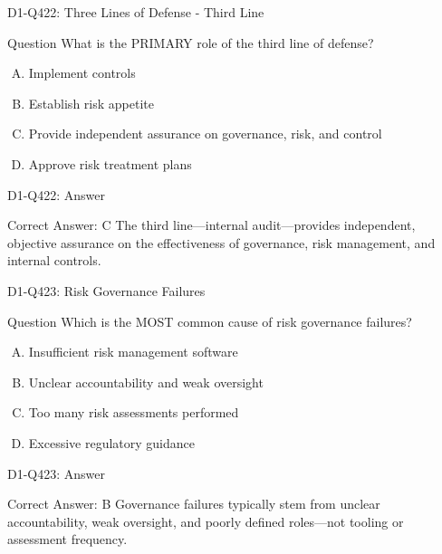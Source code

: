\documentclass{beamer}
\begin{document}
\begin{frame}{D1-Q422: Three Lines of Defense - Third Line}
	\begin{block}{Question}
		What is the PRIMARY role of the third line of defense?
	\end{block}
	\begin{enumerate}[(A)]
		\item Implement controls
		\item Establish risk appetite
		\item Provide independent assurance on governance, risk, and control
		\item Approve risk treatment plans
	\end{enumerate}
\end{frame}
\begin{frame}{D1-Q422: Answer}
	\begin{block}{Correct Answer: C}
		The third line—internal audit—provides independent, objective assurance on the effectiveness of governance, risk management, and internal controls.
	\end{block}
\end{frame}

\begin{frame}{D1-Q423: Risk Governance Failures}
	\begin{block}{Question}
		Which is the MOST common cause of risk governance failures?
	\end{block}
	\begin{enumerate}[(A)]
		\item Insufficient risk management software
		\item Unclear accountability and weak oversight
		\item Too many risk assessments performed
		\item Excessive regulatory guidance
	\end{enumerate}
\end{frame}
\begin{frame}{D1-Q423: Answer}
	\begin{block}{Correct Answer: B}
		Governance failures typically stem from unclear accountability, weak oversight, and poorly defined roles—not tooling or assessment frequency.
	\end{block}
\end{frame}
\end{document}
